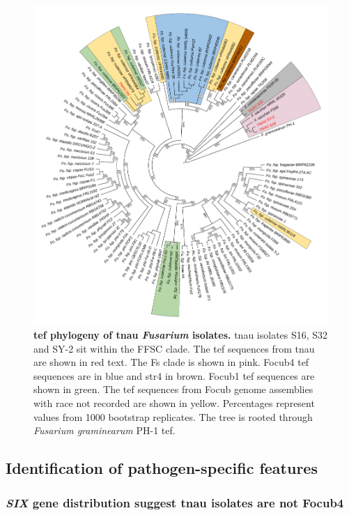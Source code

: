 

\begin{figure}[htp!]
    \centering
    \includegraphics[width=14cm]{Figures/TEF1-aPhylo3.pdf}
    \caption[\Acl{tef} phylogeny of \acl{tnau} \textit{Fusarium} isolates.]{\textbf{\Acl{tef} phylogeny of \acl{tnau} \textit{Fusarium} isolates.} \Ac{tnau} isolates S16, S32 and SY-2 sit within the \acf{FFSC} clade. The \ac{tef} sequences from \ac{tnau} are shown in red text. The \acf{Fs} clade is shown in pink. \Acf{Focub4} \ac{tef} sequences are in blue and \acf{str4} in brown. \Acf{Focub1} \ac{tef} sequences are shown in green. The \ac{tef} sequences from \acf{Focub} genome assemblies with race not recorded are shown in yellow. Percentages represent values from 1000 bootstrap replicates. The tree is rooted through \textit{Fusarium graminearum} PH-1 \ac{tef}.}
    \label{fig:TEF1aPhylo}
\end{figure}
\bigskip

\subsection{Identification of pathogen-specific features}

\subsubsection{\textit{SIX} gene distribution suggest \ac{tnau} isolates are not \acl{Focub4}}
\label{sec:chap2SixGene}

